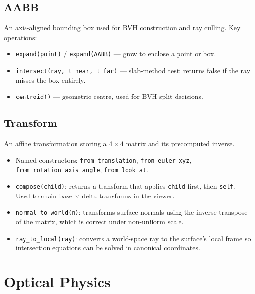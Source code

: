 \documentclass[12pt,a4paper]{report}
\begin{document}
\section{AABB}

An axis-aligned bounding box used for BVH construction and ray culling.  Key operations:

\begin{itemize}
  \item \texttt{expand(point)} / \texttt{expand(AABB)} — grow to enclose a point or box.
  \item \texttt{intersect(ray, t\_near, t\_far)} — slab-method test; returns false if the ray
        misses the box entirely.
  \item \texttt{centroid()} — geometric centre, used for BVH split decisions.
\end{itemize}

\section{Transform}

An affine transformation storing a $4\times4$ matrix and its precomputed inverse.

\begin{itemize}
  \item Named constructors: \texttt{from\_translation}, \texttt{from\_euler\_xyz},
        \texttt{from\_rotation\_axis\_angle}, \texttt{from\_look\_at}.
  \item \texttt{compose(child)}: returns a transform that applies \texttt{child} first, then
        \texttt{self}.  Used to chain base $\times$ delta transforms in the viewer.
  \item \texttt{normal\_to\_world(n)}: transforms surface normals using the inverse-transpose
        of the matrix, which is correct under non-uniform scale.
  \item \texttt{ray\_to\_local(ray)}: converts a world-space ray to the surface's local frame
        so intersection equations can be solved in canonical coordinates.
\end{itemize}

\chapter{Optical Physics}
\end{document}
